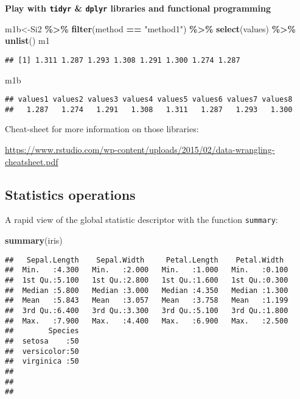 \documentclass[
]{article}
\newenvironment{Shaded}{\begin{snugshade}}{\end{snugshade}}
\newcommand{\FunctionTok}[1]{\textcolor[rgb]{0.13,0.29,0.53}{\textbf{#1}}}
\newcommand{\NormalTok}[1]{#1}
\newcommand{\OtherTok}[1]{\textcolor[rgb]{0.56,0.35,0.01}{#1}}
\newcommand{\SpecialCharTok}[1]{\textcolor[rgb]{0.81,0.36,0.00}{\textbf{#1}}}
\newcommand{\StringTok}[1]{\textcolor[rgb]{0.31,0.60,0.02}{#1}}
\begin{document}
\textbf{Play with \texttt{tidyr} \& \texttt{dplyr} libraries and
functional programming}

\begin{Shaded}
\begin{Highlighting}[]
\NormalTok{m1b}\OtherTok{\textless{}{-}}\NormalTok{Si2 }\SpecialCharTok{\%\textgreater{}\%} \FunctionTok{filter}\NormalTok{(method }\SpecialCharTok{==} \StringTok{"method1"}\NormalTok{) }\SpecialCharTok{\%\textgreater{}\%} \FunctionTok{select}\NormalTok{(values) }\SpecialCharTok{\%\textgreater{}\%} \FunctionTok{unlist}\NormalTok{()}
\NormalTok{m1}
\end{Highlighting}
\end{Shaded}

\begin{verbatim}
## [1] 1.311 1.287 1.293 1.308 1.291 1.300 1.274 1.287
\end{verbatim}

\begin{Shaded}
\begin{Highlighting}[]
\NormalTok{m1b}
\end{Highlighting}
\end{Shaded}

\begin{verbatim}
## values1 values2 values3 values4 values5 values6 values7 values8 
##   1.287   1.274   1.291   1.308   1.311   1.287   1.293   1.300
\end{verbatim}

Cheat-sheet for more information on those libraries:

\url{https://www.rstudio.com/wp-content/uploads/2015/02/data-wrangling-cheatsheet.pdf}

\hypertarget{statistics-operations}{%
\subsection{Statistics operations}\label{statistics-operations}}

A rapid view of the global statistic descriptor with the function
\texttt{summary}:

\begin{Shaded}
\begin{Highlighting}[]
\FunctionTok{summary}\NormalTok{(iris)}
\end{Highlighting}
\end{Shaded}

\begin{verbatim}
##   Sepal.Length    Sepal.Width     Petal.Length    Petal.Width   
##  Min.   :4.300   Min.   :2.000   Min.   :1.000   Min.   :0.100  
##  1st Qu.:5.100   1st Qu.:2.800   1st Qu.:1.600   1st Qu.:0.300  
##  Median :5.800   Median :3.000   Median :4.350   Median :1.300  
##  Mean   :5.843   Mean   :3.057   Mean   :3.758   Mean   :1.199  
##  3rd Qu.:6.400   3rd Qu.:3.300   3rd Qu.:5.100   3rd Qu.:1.800  
##  Max.   :7.900   Max.   :4.400   Max.   :6.900   Max.   :2.500  
##        Species  
##  setosa    :50  
##  versicolor:50  
##  virginica :50  
##                 
##                 
## 
\end{verbatim}
\end{document}
